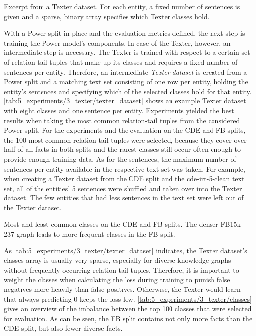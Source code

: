 \begin{table}
    \makebox[\textwidth][c]{
        
    }
    \caption{Excerpt from a Texter dataset. For each entity, a fixed number of sentences is given and a sparse, binary array specifies which Texter classes hold.}
    \label{tab:5_experiments/3_texter/texter_dataset}
\end{table}

With a Power split in place and the evaluation metrics defined, the next step is training the Power model's components. In case of the Texter, however, an intermediate step is necessary. The Texter is trained with respect to a certain set of relation-tail tuples that make up its classes and requires a fixed number of sentences per entity. Therefore, an intermediate \emph{Texter dataset} is created from a Power split and a matching text set consisting of one row per entity, holding the entity's sentences and specifying which of the selected classes hold for that entity. \autoref{tab:5_experiments/3_texter/texter_dataset} shows an example Texter dataset with eight classes and one sentence per entity. Experiments yielded the best results when taking the most common relation-tail tuples from the considered Power split. For the experiments and the evaluation on the CDE and FB splits, the 100 most common relation-tail tuples were selected, because they cover over half of all facts in both splits and the rarest classes still occur often enough to provide enough training data. As for the sentences, the maximum number of sentences per entity available in the respective text set was taken. For example, when creating a Texter dataset from the CDE split and the cde-irt-5-clean text set, all of the entities' 5 sentences were shuffled and taken over into the Texter dataset. The few entities that had less sentences in the text set were left out of the Texter dataset.

\begin{table}[t]
    \makebox[\textwidth][c]{
        
    }
    \caption{Most and least common classes on the CDE and FB splits. The denser FB15k-237 graph leads to more frequent classes in the FB split.}
    \label{tab:5_experiments/3_texter/classes}
\end{table}

As \autoref{tab:5_experiments/3_texter/texter_dataset} indicates, the Texter dataset's classes array is usually very sparse, especially for diverse knowledge graphs without frequently occurring relation-tail tuples. Therefore, it is important to weight the classes when calculating the loss during training to punish false negatives more heavily than false positives. Otherwise, the Texter would learn that always predicting 0 keeps the loss low. \autoref{tab:5_experiments/3_texter/classes} gives an overview of the imbalance between the top 100 classes that were selected for evaluation. As can be seen, the FB split contains not only more facts than the CDE split, but also fewer diverse facts.

